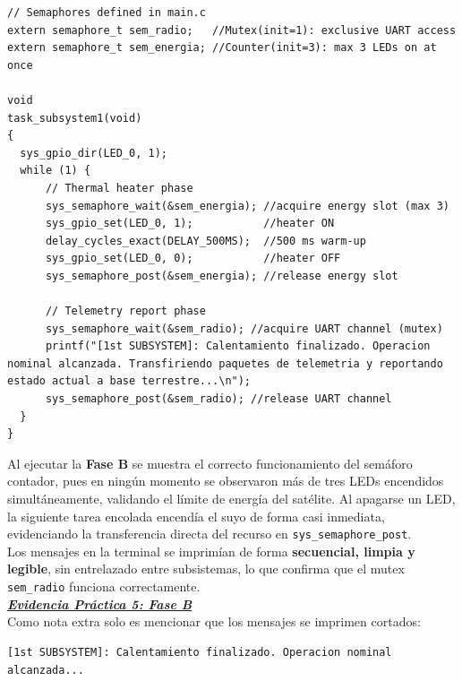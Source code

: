 \documentclass[12pt,letterpaper]{article}
\begin{document}
\begin{lstlisting}[style=modernc, caption={\texttt{user\_app.c}, semaphores declared and \texttt{task\_subsystem1}}]
// Semaphores defined in main.c
extern semaphore_t sem_radio;   //Mutex(init=1): exclusive UART access
extern semaphore_t sem_energia; //Counter(init=3): max 3 LEDs on at once

void
task_subsystem1(void)
{
  sys_gpio_dir(LED_0, 1);
  while (1) {
      // Thermal heater phase
      sys_semaphore_wait(&sem_energia); //acquire energy slot (max 3)
      sys_gpio_set(LED_0, 1);           //heater ON
      delay_cycles_exact(DELAY_500MS);  //500 ms warm-up
      sys_gpio_set(LED_0, 0);           //heater OFF
      sys_semaphore_post(&sem_energia); //release energy slot

      // Telemetry report phase
      sys_semaphore_wait(&sem_radio); //acquire UART channel (mutex)
      printf("[1st SUBSYSTEM]: Calentamiento finalizado. Operacion nominal alcanzada. Transfiriendo paquetes de telemetria y reportando estado actual a base terrestre...\n");
      sys_semaphore_post(&sem_radio); //release UART channel
  }
}
\end{lstlisting}

\bigskip

\noindent
Al ejecutar la \textbf{Fase B} se muestra el correcto funcionamiento del semáforo contador, pues en ningún momento se observaron más de tres LEDs encendidos simultáneamente, validando el límite de energía del satélite. Al apagarse un LED, la siguiente tarea encolada encendía el suyo de forma casi inmediata, evidenciando la transferencia directa del recurso en \texttt{sys\_semaphore\_post}.\\

Los mensajes en la terminal se imprimían de forma \textbf{secuencial, limpia y legible}, sin entrelazado entre subsistemas, lo que confirma que el mutex \texttt{sem\_radio} funciona correctamente.\\

\href{https://drive.google.com/file/d/1uVFFZONrw-ooMVKhCwuL4oLu651Wa1V4/view?usp=sharing&t=166}
     {\textbf{\textit{\textcolor{linkblue}{Evidencia Práctica 5: Fase B}}}}\\

\noindent
Como nota extra solo es mencionar que los mensajes se imprimen cortados:
     
\begin{verbatim}
[1st SUBSYSTEM]: Calentamiento finalizado. Operacion nominal alcanzada...
\end{verbatim}
\end{document}
